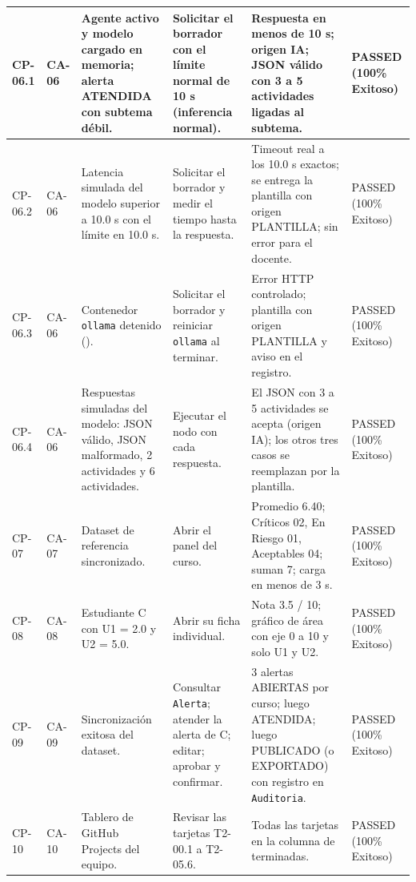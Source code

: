 \documentclass[11pt,a4paper]{article}
\begin{document}
\begin{longtable}{|R{1.35cm}|R{1.1cm}|R{2.6cm}|R{3.1cm}|R{3.1cm}|R{1.7cm}|}
\footnotesize CP-06.1 & \footnotesize CA-06 & \footnotesize Agente activo y modelo cargado en memoria; alerta ATENDIDA con subtema débil. & \footnotesize Solicitar el borrador con el límite normal de 10 s (inferencia normal). & \footnotesize Respuesta en menos de 10 s; origen IA; JSON válido con 3 a 5 actividades ligadas al subtema. & \footnotesize PASSED (100\% Exitoso)\\ \hline
\footnotesize CP-06.2 & \footnotesize CA-06 & \footnotesize Latencia simulada del modelo superior a 10.0 s con el límite en 10.0 s. & \footnotesize Solicitar el borrador y medir el tiempo hasta la respuesta. & \footnotesize Timeout real a los 10.0 s exactos; se entrega la plantilla con origen PLANTILLA; sin error para el docente. & \footnotesize PASSED (100\% Exitoso)\\ \hline
\footnotesize CP-06.3 & \footnotesize CA-06 & \footnotesize Contenedor \texttt{ollama} detenido (). & \footnotesize Solicitar el borrador y reiniciar \texttt{ollama} al terminar. & \footnotesize Error HTTP controlado; plantilla con origen PLANTILLA y aviso en el registro. & \footnotesize PASSED (100\% Exitoso)\\ \hline
\footnotesize CP-06.4 & \footnotesize CA-06 & \footnotesize Respuestas simuladas del modelo: JSON válido, JSON malformado, 2 actividades y 6 actividades. & \footnotesize Ejecutar el nodo  con cada respuesta. & \footnotesize El JSON con 3 a 5 actividades se acepta (origen IA); los otros tres casos se reemplazan por la plantilla. & \footnotesize PASSED (100\% Exitoso)\\ \hline
\footnotesize CP-07 & \footnotesize CA-07 & \footnotesize Dataset de referencia sincronizado. & \footnotesize Abrir el panel del curso. & \footnotesize Promedio 6.40; Críticos 02, En Riesgo 01, Aceptables 04; suman 7; carga en menos de 3 s. & \footnotesize PASSED (100\% Exitoso)\\ \hline
\footnotesize CP-08 & \footnotesize CA-08 & \footnotesize Estudiante C con U1 = 2.0 y U2 = 5.0. & \footnotesize Abrir su ficha individual. & \footnotesize Nota 3.5 / 10; gráfico de área con eje 0 a 10 y solo U1 y U2. & \footnotesize PASSED (100\% Exitoso)\\ \hline
\footnotesize CP-09 & \footnotesize CA-09 & \footnotesize Sincronización exitosa del dataset. & \footnotesize Consultar \texttt{Alerta}; atender la alerta de C; editar; aprobar y confirmar. & \footnotesize 3 alertas ABIERTAS por curso; luego ATENDIDA; luego PUBLICADO (o EXPORTADO) con registro en \texttt{Auditoria}. & \footnotesize PASSED (100\% Exitoso)\\ \hline
\footnotesize CP-10 & \footnotesize CA-10 & \footnotesize Tablero de GitHub Projects del equipo. & \footnotesize Revisar las tarjetas T2-00.1 a T2-05.6. & \footnotesize Todas las tarjetas en la columna de terminadas. & \footnotesize PASSED (100\% Exitoso)\\ \hline
\end{longtable}
\end{document}
